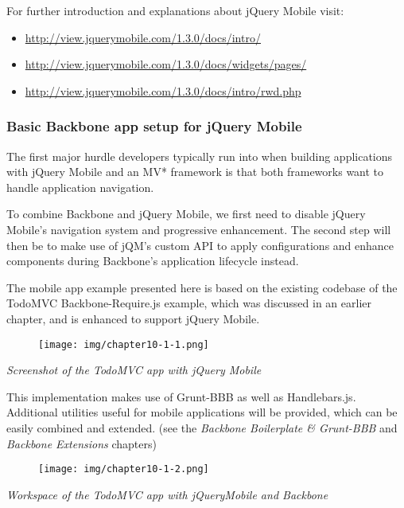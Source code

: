 \documentclass[9pt]{book}
\begin{document}
For further introduction and explanations about jQuery Mobile visit:

\begin{itemize}
\itemsep1pt\parskip0pt
\item
  \url{http://view.jquerymobile.com/1.3.0/docs/intro/}
\item
  \url{http://view.jquerymobile.com/1.3.0/docs/widgets/pages/}
\item
  \url{http://view.jquerymobile.com/1.3.0/docs/intro/rwd.php}
\end{itemize}

\subsubsection{Basic Backbone app setup for jQuery
Mobile}\label{basic-backbone-app-setup-for-jquery-mobile}

The first major hurdle developers typically run into when building
applications with jQuery Mobile and an MV* framework is that both
frameworks want to handle application navigation.

To combine Backbone and jQuery Mobile, we first need to disable jQuery
Mobile's navigation system and progressive enhancement. The second step
will then be to make use of jQM's custom API to apply configurations and
enhance components during Backbone's application lifecycle instead.

The mobile app example presented here is based on the existing codebase
of the TodoMVC Backbone-Require.js example, which was discussed in an
earlier chapter, and is enhanced to support jQuery Mobile.

\begin{figure}[htbp]
\centering
\texttt{[image: img/chapter10-1-1.png]}
\end{figure}

\emph{Screenshot of the TodoMVC app with jQuery Mobile}

This implementation makes use of Grunt-BBB as well as Handlebars.js.
Additional utilities useful for mobile applications will be provided,
which can be easily combined and extended. (see the \emph{Backbone
Boilerplate \& Grunt-BBB} and \emph{Backbone Extensions} chapters)

\begin{figure}[htbp]
\centering
\texttt{[image: img/chapter10-1-2.png]}
\end{figure}

\emph{Workspace of the TodoMVC app with jQueryMobile and Backbone}
\end{document}
